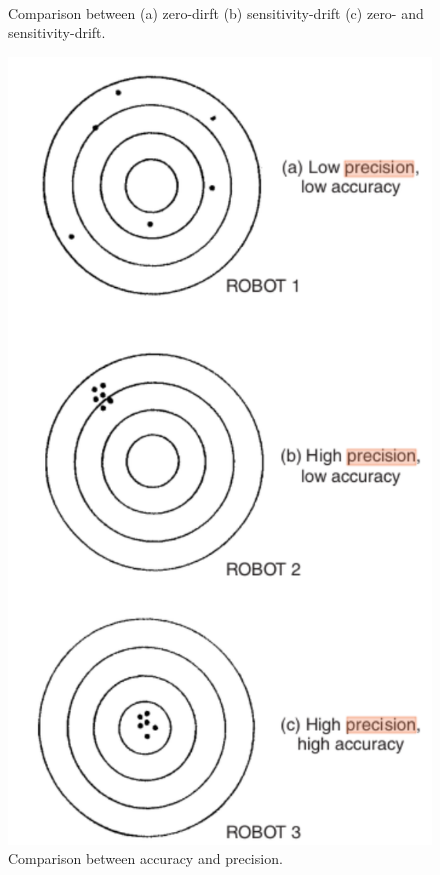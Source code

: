 \documentclass[a4paper,11pt]{book}
\begin{document}
\begin{figure}[h!]\label{fig:comparison}
   
    \label{fig:zdrift}\hfill
    \label{fig:sdrift}\\
   \label{fig:zsdrift}\hfill
  \caption{ Comparison between (a) zero-dirft (b) sensitivity-drift (c) zero- and sensitivity-drift.} 
\end{figure}

\begin{figure}[h!]\label{fig:comparison}
  \includegraphics[width=0.40\linewidth]{acc_precision}
  \caption{ Comparison between accuracy and precision.} 
\end{figure}
\end{document}
